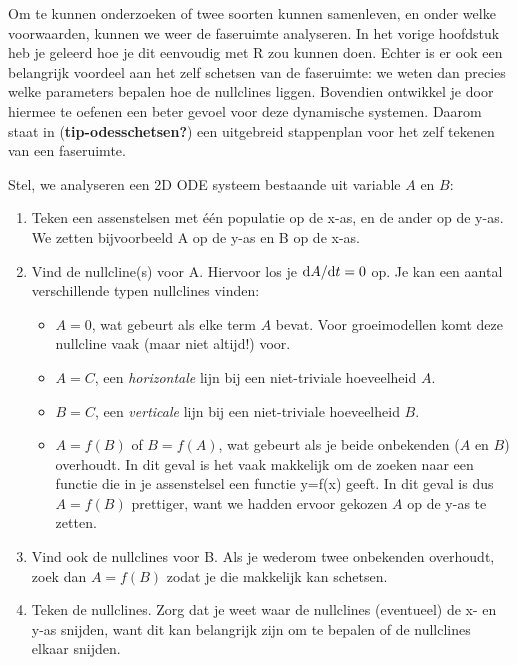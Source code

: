 \documentclass[
  a4paper,
]{scrbook}
\providecommand{\tightlist}{%
  \setlength{\itemsep}{0pt}\setlength{\parskip}{0pt}}\usepackage{longtable,booktabs,array}
\theoremstyle{definition}
\theoremstyle{remark}
\begin{document}
Om te kunnen onderzoeken of twee soorten kunnen samenleven, en onder
welke voorwaarden, kunnen we weer de faseruimte analyseren. In het
vorige hoofdstuk heb je geleerd hoe je dit eenvoudig met R zou kunnen
doen. Echter is er ook een belangrijk voordeel aan het zelf schetsen van
de faseruimte: we weten dan precies welke parameters bepalen hoe de
nullclines liggen. Bovendien ontwikkel je door hiermee te oefenen een
beter gevoel voor deze dynamische systemen. Daarom staat in
(\textbf{tip-odesschetsen?}) een uitgebreid stappenplan voor het zelf
tekenen van een faseruimte.

\begin{tcolorbox}[enhanced jigsaw, coltitle=black, breakable, bottomtitle=1mm, opacityback=0, colback=white, rightrule=.15mm, title=\textcolor{quarto-callout-tip-color}{\faLightbulb}\hspace{0.5em}{Algemeen stappenplan voor het schetsen van faseruimtes.}, bottomrule=.15mm, toprule=.15mm, left=2mm, colframe=quarto-callout-tip-color-frame, toptitle=1mm, opacitybacktitle=0.6, titlerule=0mm, colbacktitle=quarto-callout-tip-color!10!white, leftrule=.75mm, arc=.35mm]

Stel, we analyseren een 2D ODE systeem bestaande uit variable \(A\) en
\(B\):

\begin{enumerate}
\def\labelenumi{\arabic{enumi}.}
\tightlist
\item
  Teken een assenstelsen met één populatie op de x-as, en de ander op de
  y-as. We zetten bijvoorbeeld A op de y-as en B op de x-as.
\item
  Vind de nullcline(s) voor A. Hiervoor los je
  \(\mathchoice{\frac{\mathrm{d}A}
  {\mathrm{d}t}}{\mathrm{d}A/\mathrm{d}t}
  {\mathrm{d}A/\mathrm{d}t}
  {\mathrm{d}A/\mathrm{d}t}=0\) op. Je kan een aantal verschillende
  typen nullclines vinden:

  \begin{itemize}
  \tightlist
  \item
    \(A=0\), wat gebeurt als elke term \(A\) bevat. Voor groeimodellen
    komt deze nullcline vaak (maar niet altijd!) voor.
  \item
    \(A=C\), een \emph{horizontale} lijn bij een niet-triviale
    hoeveelheid \(A\).
  \item
    \(B=C\), een \emph{verticale} lijn bij een niet-triviale hoeveelheid
    \(B\).
  \item
    \(A=f(B)\) of \(B=f(A)\), wat gebeurt als je beide onbekenden (\(A\)
    en \(B\)) overhoudt. In dit geval is het vaak makkelijk om de zoeken
    naar een functie die in je assenstelsel een functie y=f(x) geeft. In
    dit geval is dus \(A=f(B)\) prettiger, want we hadden ervoor gekozen
    \(A\) op de y-as te zetten.
  \end{itemize}
\item
  Vind ook de nullclines voor B. Als je wederom twee onbekenden
  overhoudt, zoek dan \(A=f(B)\) zodat je die makkelijk kan schetsen.
\item
  Teken de nullclines. Zorg dat je weet waar de nullclines (eventueel)
  de x- en y-as snijden, want dit kan belangrijk zijn om te bepalen of
  de nullclines elkaar snijden.


\end{enumerate}
\end{tcolorbox}
\end{document}
